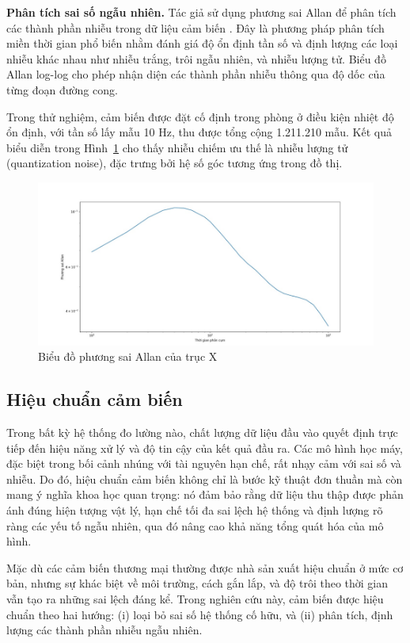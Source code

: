 \textbf{Phân tích sai số ngẫu nhiên.} Tác giả sử dụng phương sai Allan 
để phân tích các thành phần nhiễu trong dữ liệu cảm biến \cite{allan}. 
Đây là phương pháp phân tích miền thời gian phổ biến nhằm đánh giá độ 
ổn định tần số và định lượng các loại nhiễu khác nhau như nhiễu trắng, 
trôi ngẫu nhiên, và nhiễu lượng tử. Biểu đồ Allan log-log cho phép nhận 
diện các thành phần nhiễu thông qua độ dốc của từng đoạn đường cong.

Trong thử nghiệm, cảm biến được đặt cố định trong phòng ở điều kiện 
nhiệt độ ổn định, với tần số lấy mẫu 10 Hz, thu được tổng cộng 1.211.210 
mẫu. Kết quả biểu diễn trong Hình~\ref{allan_real} cho thấy nhiễu chiếm 
ưu thế là nhiễu lượng tử (quantization noise), đặc trưng bởi hệ số góc 
tương ứng trong đồ thị.



\begin{figure}[htbp]
    \centering
    \includegraphics[width=\textwidth]{images/allan_real.png}
    \caption{Biểu đồ phương sai Allan của trục X}
    \label{allan_real}
\end{figure}
\subsection{Hiệu chuẩn cảm biến}

Trong bất kỳ hệ thống đo lường nào, chất lượng dữ liệu đầu vào quyết định trực tiếp đến hiệu năng xử lý và độ tin cậy của kết quả đầu ra. Các mô hình học máy, đặc biệt trong bối cảnh nhúng với tài nguyên hạn chế, rất nhạy cảm với sai số và nhiễu. Do đó, hiệu chuẩn cảm biến không chỉ là bước kỹ thuật đơn thuần mà còn mang ý nghĩa khoa học quan trọng: nó đảm bảo rằng dữ liệu thu thập được phản ánh đúng hiện tượng vật lý, hạn chế tối đa sai lệch hệ thống và định lượng rõ ràng các yếu tố ngẫu nhiên, qua đó nâng cao khả năng tổng quát hóa của mô hình.

Mặc dù các cảm biến thương mại thường được nhà sản xuất hiệu chuẩn ở mức cơ bản, nhưng sự khác biệt về môi trường, cách gắn lắp, và độ trôi theo thời gian vẫn tạo ra những sai lệch đáng kể. Trong nghiên cứu này, cảm biến được hiệu chuẩn theo hai hướng: (i) loại bỏ sai số hệ thống cố hữu, và (ii) phân tích, định lượng các thành phần nhiễu ngẫu nhiên.


